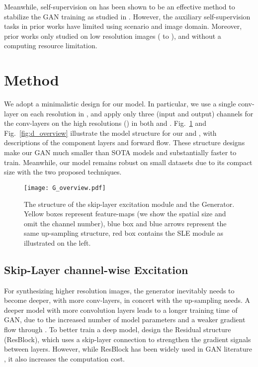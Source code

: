 \documentclass{article} \usepackage{iclr2021_conference,times}
\begin{document}
Meanwhile, self-supervision on  has been shown to be an effective method to stabilize the GAN training as studied in \cite{tran2019self,chen2019self}. However, the auxiliary self-supervision tasks in prior works have limited using scenario and image domain. Moreover, prior works only studied on low resolution images ( to ), and without a computing resource limitation.  

\section{Method}

We adopt a minimalistic design for our model. In particular, we use a single conv-layer on each resolution in , and apply only three (input and output) channels for the conv-layers on the high resolutions () in both  and . 
Fig.~\ref{fig:g_overview} and Fig.~\ref{fig:d_overview}  illustrate the model structure for our  and , with descriptions of the component layers and forward flow. These structure designs make our GAN much smaller than SOTA models and substantially faster to train. Meanwhile, our model remains robust on small datasets due to its compact size with the two proposed techniques.


\begin{figure}[h]
\begin{center}
\texttt{[image: G\_overview.pdf]}
\end{center}
\caption{The structure of the skip-layer excitation module and the Generator. Yellow boxes represent feature-maps (we show the spatial size and omit the channel number), blue box and blue arrows represent the same up-sampling structure, red box contains the SLE module as illustrated on the left.}
\label{fig:g_overview}
\end{figure}


\subsection{Skip-Layer channel-wise Excitation}

For synthesizing higher resolution images, the generator  inevitably needs to become deeper, with more conv-layers, in concert with the up-sampling needs. A deeper model with more convolution layers leads to a longer training time of GAN, due to the increased number of model parameters and a weaker gradient flow through  \citep{zhang2017stackgan,karras2017progressive,karnewar2019msg}. To better train a deep model, \citeauthor{he2016deep} design the Residual structure (ResBlock), which uses a skip-layer connection to strengthen the gradient signals between layers. However, while ResBlock has been widely used in GAN literature \citep{wang2018high,karras2020analyzing}, it also increases the computation cost. 
\end{document}

